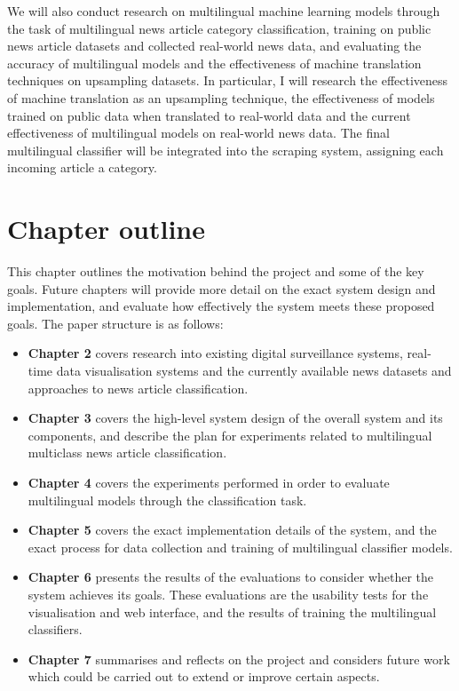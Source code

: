 \documentclass{l4proj}
\begin{document}
We will also conduct research on multilingual machine learning models through the task of multilingual news article category classification, training on public news article datasets and collected real-world news data, and evaluating the accuracy of multilingual models and the effectiveness of machine translation techniques on upsampling datasets. In particular, I will research the effectiveness of machine translation as an upsampling technique, the effectiveness of models trained on public data when translated to real-world data and the current effectiveness of multilingual models on real-world news data. The final multilingual classifier will be integrated into the scraping system, assigning each incoming article a category.

\section{Chapter outline}
This chapter outlines the motivation behind the project and some of the key goals. Future chapters will provide more detail on the exact system design and implementation, and evaluate how effectively the system meets these proposed goals. The paper structure is as follows:
\begin{itemize}
\item \textbf{Chapter 2} covers research into existing digital surveillance systems, real-time data visualisation systems and the currently available news datasets and approaches to news article classification. 
\item \textbf{Chapter 3} covers the high-level system design of the overall system and its components, and describe the plan for experiments related to multilingual multiclass news article classification.
\item \textbf{Chapter 4} covers the experiments performed in order to evaluate multilingual models through the classification task.
\item \textbf{Chapter 5} covers the exact implementation details of the system, and the exact process for data collection and training of multilingual classifier models.
\item \textbf{Chapter 6} presents the results of the evaluations to consider whether the system achieves its goals. These evaluations are the usability tests for the visualisation and web interface, and the results of training the multilingual classifiers.
\item \textbf{Chapter 7} summarises and reflects on the project and considers future work which could be carried out to extend or improve certain aspects.
\end{itemize}
\end{document}
